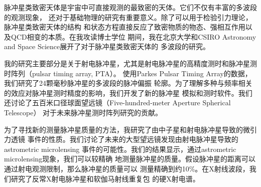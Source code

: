 
\begin{cabstract}

脉冲星类致密天体是宇宙中可直接观测的最致密的天体。它们不仅有丰富的多波段的观测现象，
还对于基础物理的研究有重要意义。除了可以用于检验引力理论，脉冲星类致密天体的结构
和状态方程直接反应了致密物质的物态、强相互作用以及QCD相变的本质。在我攻读博士学位
期间，我在北京大学和CSIRO Astronomy and Space Science展开了对于脉冲星类致密天体的
多波段的研究。

我的研究主要部分是关于射电脉冲星，尤其是射电脉冲星的高精度测时和脉冲星测时阵列（pulsar timing array, PTA）。
使用Parkes Pulsar Timing Array的数据，我们研究了24颗毫秒脉冲星的多波段的脉冲偏振
轮廓。为了理解多种与频率相关的效应对脉冲星测时精度的影响，我们开发了新的脉冲星
模拟和测时软件。我们还讨论了五百米口径球面望远镜（Five-hundred-meter Aperture Spherical Telescope）
对于未来脉冲星测时阵列研究的贡献。

为了寻找新的测量脉冲星质量的方法，我研究了由中子星和射电脉冲星导致的微引力透镜
事件的性质。我们讨论了未来的大型望远镜发现由射电脉冲星导致的astrometric microlensing
事件的可能性。我们的结果显示，通过astrometric microlensing现象，我们可以较精确
地测量脉冲星的质量。假设脉冲星的距离可以通过射电观测限制，那么脉冲星的质量可以
测量精确到约10\%。在X射线波段，我们研究了反常X射电脉冲星和软伽马射线重复包
的硬X射电谱。
	\pkuthssffaq
\end{cabstract}

